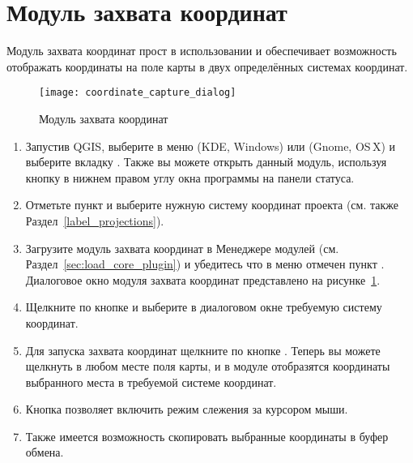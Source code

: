 
\section{Модуль захвата координат}


Модуль захвата координат прост в использовании и обеспечивает возможность
отображать координаты на поле карты в двух определённых системах координат.

\begin{figure}[ht]
   \centering
   \texttt{[image: coordinate\_capture\_dialog]}
   \caption{Модуль захвата координат \wincaption}\label{fig:coordinate_capture_dialog}
\end{figure}

\begin{enumerate}
  \item Запустив QGIS, выберите  в меню
   (KDE, Windows) или  (Gnome, OS\,X)
  и выберите вкладку . Также вы можете открыть данный модуль,
  используя кнопку 
  в нижнем правом углу окна программы на панели статуса.
  \item Отметьте пункт 
  и выберите нужную систему координат проекта (см. также Раздел~\ref{label_projections}).
  \item Загрузите модуль захвата координат в Менеджере модулей (см. Раздел~\ref{sec:load_core_plugin})
  и убедитесь что в меню  \arrow {}
  отмечен пункт .
  Диалоговое окно модуля захвата координат представлено на
  рисунке~\ref{fig:coordinate_capture_dialog}.
  \item Щелкните по кнопке  и выберите в диалоговом окне
  требуемую систему координат.
  \item Для запуска захвата координат щелкните по кнопке .
  Теперь вы можете щелкнуть в любом месте поля карты, и в модуле отобразятся
  координаты выбранного места в требуемой системе координат.
  \item Кнопка  позволяет включить
  режим слежения за курсором мыши.
  \item Также имеется возможность скопировать выбранные координаты в буфер обмена.
\end{enumerate}

\FloatBarrier
